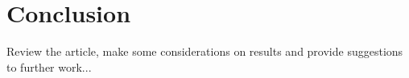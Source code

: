 \section{Conclusion}
    Review the article, make some considerations on results and provide suggestions to further work...
